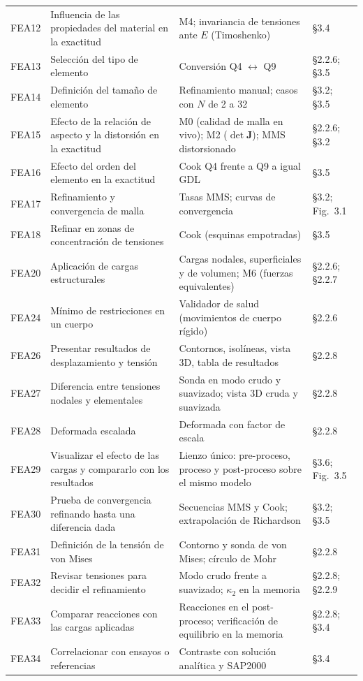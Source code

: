 \documentclass[11pt,a4paper]{article}
\begin{document}
\begin{longtable}{L{1.5cm}L{6.0cm}L{5.4cm}L{2.5cm}}
FEA12 & Influencia de las propiedades del material en la exactitud & M4; invariancia de tensiones ante $E$ (Timoshenko) & §3.4 \\
FEA13 & Selección del tipo de elemento & Conversión Q4 $\leftrightarrow$ Q9 & §2.2.6; §3.5 \\
FEA14 & Definición del tamaño de elemento & Refinamiento manual; casos con $N$ de 2 a 32 & §3.2; §3.5 \\
FEA15 & Efecto de la relación de aspecto y la distorsión en la exactitud & M0 (calidad de malla en vivo); M2 ($\det\bm{J}$); MMS distorsionado & §2.2.6; §3.2 \\
FEA16 & Efecto del orden del elemento en la exactitud & Cook Q4 frente a Q9 a igual GDL & §3.5 \\
FEA17 & Refinamiento y convergencia de malla & Tasas MMS; curvas de convergencia & §3.2; Fig.~3.1 \\
FEA18 & Refinar en zonas de concentración de tensiones & Cook (esquinas empotradas) & §3.5 \\
FEA20 & Aplicación de cargas estructurales & Cargas nodales, superficiales y de volumen; M6 (fuerzas equivalentes) & §2.2.6; §2.2.7 \\
FEA24 & Mínimo de restricciones en un cuerpo & Validador de salud (movimientos de cuerpo rígido) & §2.2.6 \\
FEA26 & Presentar resultados de desplazamiento y tensión & Contornos, isolíneas, vista 3D, tabla de resultados & §2.2.8 \\
FEA27 & Diferencia entre tensiones nodales y elementales & Sonda en modo crudo y suavizado; vista 3D cruda y suavizada & §2.2.8 \\
FEA28 & Deformada escalada & Deformada con factor de escala & §2.2.8 \\
FEA29 & Visualizar el efecto de las cargas y compararlo con los resultados & Lienzo único: pre-proceso, proceso y post-proceso sobre el mismo modelo & §3.6; Fig.~3.5 \\
FEA30 & Prueba de convergencia refinando hasta una diferencia dada & Secuencias MMS y Cook; extrapolación de Richardson & §3.2; §3.5 \\
FEA31 & Definición de la tensión de von Mises & Contorno y sonda de von Mises; círculo de Mohr & §2.2.8 \\
FEA32 & Revisar tensiones para decidir el refinamiento & Modo crudo frente a suavizado; $\kappa_2$ en la memoria & §2.2.8; §2.2.9 \\
FEA33 & Comparar reacciones con las cargas aplicadas & Reacciones en el post-proceso; verificación de equilibrio en la memoria & §2.2.8; §3.4 \\
FEA34 & Correlacionar con ensayos o referencias & Contraste con solución analítica y SAP2000 & §3.4 \\
\bottomrule
\end{longtable}
\end{document}
